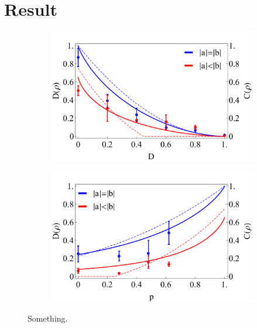 \documentclass[%
 reprint,
 amsmath,amssymb,
 aps,
]{revtex4-1}
\begin{document}
\section{Result}
\begin{figure}
        \centering
        \begin{subfigure}[b]{0.49\textwidth}
                \includegraphics[width=\textwidth]{DD}
                \caption{}
                \label{fig:DD}
        \end{subfigure}
        \vfill
        \begin{subfigure}[b]{0.49\textwidth}
                \includegraphics[width=\textwidth]{Dp}
                \caption{}
                \label{fig:Dp}
        \end{subfigure}
        \caption{Something.}\label{fig:D}
\end{figure}
\end{document}
